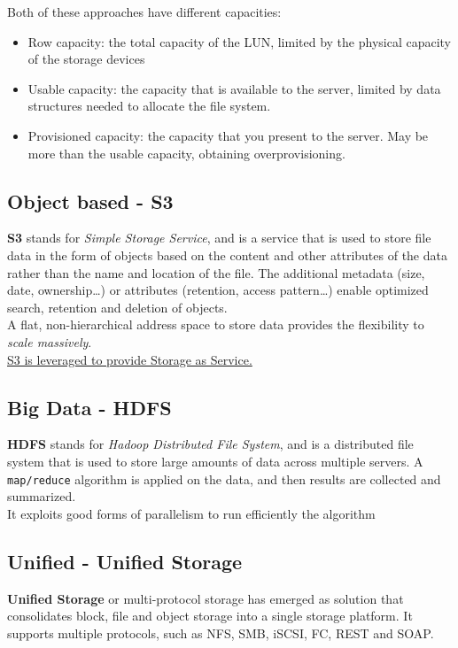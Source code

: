 Both of these approaches have different capacities:\ns
\begin{itemize}
   \item Row capacity: the total capacity of the LUN, limited by the physical capacity of the storage devices
   \item Usable capacity: the capacity that is available to the server, limited by data structures needed to allocate the file system.
   \item Provisioned capacity: the capacity that you present to the server. May be more than the usable capacity, obtaining overprovisioning. 
\end{itemize}

\subsection{Object based - S3}
\textbf{S3} stands for \textit{Simple Storage Service}, and is a service that is used to store file data in the form of objects based on the content and other attributes of the data rather than the name and location of the file.
The additional metadata (size, date, ownership\dots) or attributes (retention, access pattern\dots) enable optimized search, retention and deletion of objects.\\
A flat, non-hierarchical address space to store data provides the flexibility to \textit{scale massively}.\\
\ul{S3 is leveraged to provide Storage as Service.}

\subsection{Big Data - HDFS}
\textbf{HDFS} stands for \textit{Hadoop Distributed File System}, and is a distributed file system that is used to store large amounts of data across multiple servers.
A \texttt{map/reduce} algorithm is applied on the data, and then results are collected and summarized.\\
It exploits good forms of parallelism to run efficiently the algorithm

\subsection{Unified - Unified Storage}
\textbf{Unified Storage} or multi-protocol storage has emerged as solution that consolidates block, file and object storage into a single storage platform. It supports multiple protocols, such as NFS, SMB, iSCSI, FC, REST and SOAP.

